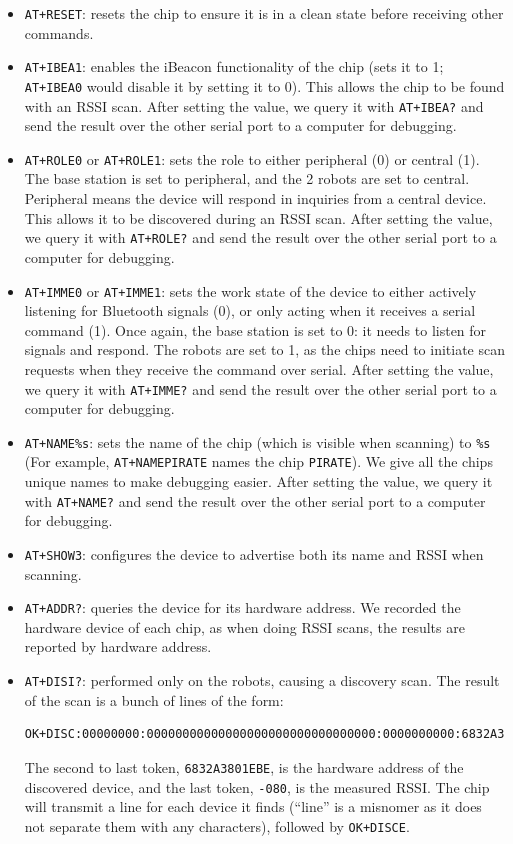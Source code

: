 \documentclass[]{article}
\begin{document}
\begin{itemize}
\item
  \texttt{AT+RESET}: resets the chip to ensure it is in a clean state
  before receiving other commands.
\item
  \texttt{AT+IBEA1}: enables the iBeacon functionality of the chip (sets
  it to 1; \texttt{AT+IBEA0} would disable it by setting it to 0). This
  allows the chip to be found with an RSSI scan. After setting the
  value, we query it with \texttt{AT+IBEA?} and send the result over the
  other serial port to a computer for debugging.
\item
  \texttt{AT+ROLE0} or \texttt{AT+ROLE1}: sets the role to either
  peripheral (0) or central (1). The base station is set to peripheral,
  and the 2 robots are set to central. Peripheral means the device will
  respond in inquiries from a central device. This allows it to be
  discovered during an RSSI scan. After setting the value, we query it
  with \texttt{AT+ROLE?} and send the result over the other serial port
  to a computer for debugging.
\item
  \texttt{AT+IMME0} or \texttt{AT+IMME1}: sets the work state of the
  device to either actively listening for Bluetooth signals (0), or only
  acting when it receives a serial command (1). Once again, the base
  station is set to 0: it needs to listen for signals and respond. The
  robots are set to 1, as the chips need to initiate scan requests when
  they receive the command over serial. After setting the value, we
  query it with \texttt{AT+IMME?} and send the result over the other
  serial port to a computer for debugging.
\item
  \texttt{AT+NAME\%s}: sets the name of the chip (which is visible when
  scanning) to \texttt{\%s} (For example, \texttt{AT+NAMEPIRATE} names
  the chip \texttt{PIRATE}). We give all the chips unique names to make
  debugging easier. After setting the value, we query it with
  \texttt{AT+NAME?} and send the result over the other serial port to a
  computer for debugging.
\item
  \texttt{AT+SHOW3}: configures the device to advertise both its name
  and RSSI when scanning.
\item
  \texttt{AT+ADDR?}: queries the device for its hardware address. We
  recorded the hardware device of each chip, as when doing RSSI scans,
  the results are reported by hardware address.
\item
  \texttt{AT+DISI?}: performed only on the robots, causing a discovery
  scan. The result of the scan is a bunch of lines of the form:

\begin{verbatim}
OK+DISC:00000000:00000000000000000000000000000000:0000000000:6832A3801EBE:-080
\end{verbatim}

  The second to last token, \texttt{6832A3801EBE}, is the hardware
  address of the discovered device, and the last token, \texttt{-080},
  is the measured RSSI. The chip will transmit a line for each device it
  finds (``line'' is a misnomer as it does not separate them with any
  characters), followed by \texttt{OK+DISCE}.
\end{itemize}
\end{document}
